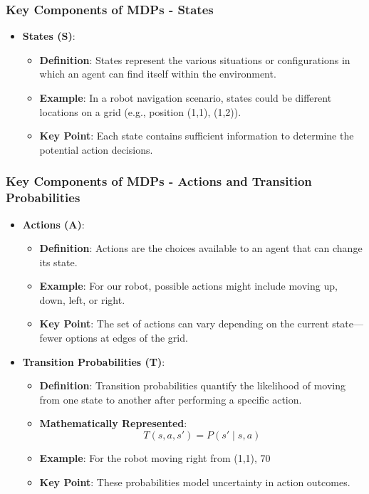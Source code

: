 \documentclass[aspectratio=169]{beamer}
\begin{document}
\begin{frame}
  \frametitle{Key Components of MDPs - States}
  \begin{itemize}
    \item \textbf{States (S)}:
      \begin{itemize}
        \item \textbf{Definition}: States represent the various situations or configurations in which an agent can find itself within the environment.
        \item \textbf{Example}: In a robot navigation scenario, states could be different locations on a grid (e.g., position (1,1), (1,2)).
        \item \textbf{Key Point}: Each state contains sufficient information to determine the potential action decisions.
      \end{itemize}
  \end{itemize}
\end{frame}

\begin{frame}
  \frametitle{Key Components of MDPs - Actions and Transition Probabilities}
  \begin{itemize}
    \item \textbf{Actions (A)}:
      \begin{itemize}
        \item \textbf{Definition}: Actions are the choices available to an agent that can change its state.
        \item \textbf{Example}: For our robot, possible actions might include moving up, down, left, or right.
        \item \textbf{Key Point}: The set of actions can vary depending on the current state—fewer options at edges of the grid.
      \end{itemize}
    
    \item \textbf{Transition Probabilities (T)}:
      \begin{itemize}
        \item \textbf{Definition}: Transition probabilities quantify the likelihood of moving from one state to another after performing a specific action.
        \item \textbf{Mathematically Represented}:
        \begin{equation}
        T(s, a, s') = P(s' \mid s, a)
        \end{equation}
        \item \textbf{Example}: For the robot moving right from (1,1), 70%
        \item \textbf{Key Point}: These probabilities model uncertainty in action outcomes.
      \end{itemize}
  \end{itemize}
\end{frame}
\end{document}
